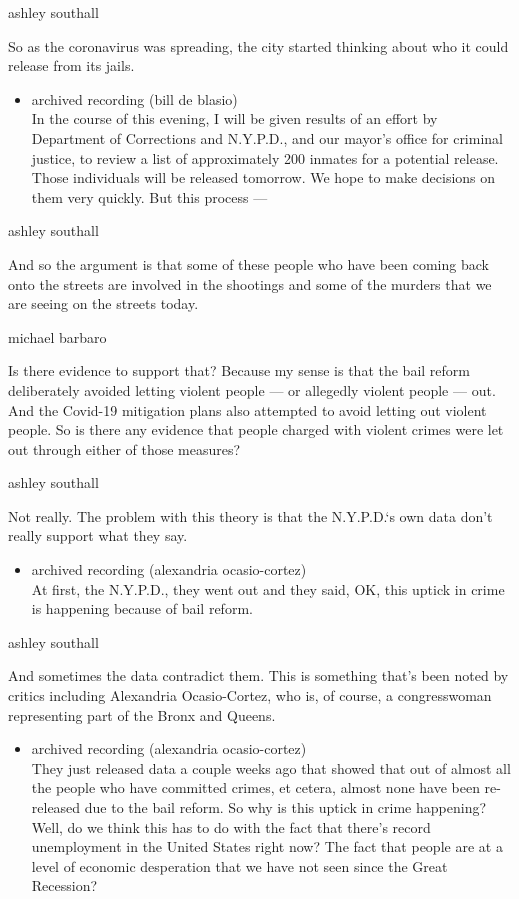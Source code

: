 ashley southall

So as the coronavirus was spreading, the city started thinking about who
it could release from its jails.

\begin{itemize}
\tightlist
\item
  archived recording (bill de blasio)\\
  In the course of this evening, I will be given results of an effort by
  Department of Corrections and N.Y.P.D., and our mayor's office for
  criminal justice, to review a list of approximately 200 inmates for a
  potential release. Those individuals will be released tomorrow. We
  hope to make decisions on them very quickly. But this process ---
\end{itemize}

ashley southall

And so the argument is that some of these people who have been coming
back onto the streets are involved in the shootings and some of the
murders that we are seeing on the streets today.

michael barbaro

Is there evidence to support that? Because my sense is that the bail
reform deliberately avoided letting violent people --- or allegedly
violent people --- out. And the Covid-19 mitigation plans also attempted
to avoid letting out violent people. So is there any evidence that
people charged with violent crimes were let out through either of those
measures?

ashley southall

Not really. The problem with this theory is that the N.Y.P.D.`s own data
don't really support what they say.

\begin{itemize}
\tightlist
\item
  archived recording (alexandria ocasio-cortez)\\
  At first, the N.Y.P.D., they went out and they said, OK, this uptick
  in crime is happening because of bail reform.
\end{itemize}

ashley southall

And sometimes the data contradict them. This is something that's been
noted by critics including Alexandria Ocasio-Cortez, who is, of course,
a congresswoman representing part of the Bronx and Queens.

\begin{itemize}
\tightlist
\item
  archived recording (alexandria ocasio-cortez)\\
  They just released data a couple weeks ago that showed that out of
  almost all the people who have committed crimes, et cetera, almost
  none have been re-released due to the bail reform. So why is this
  uptick in crime happening? Well, do we think this has to do with the
  fact that there's record unemployment in the United States right now?
  The fact that people are at a level of economic desperation that we
  have not seen since the Great Recession?
\end{itemize}

